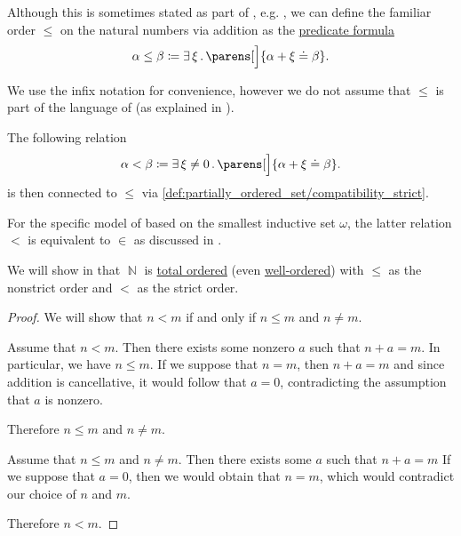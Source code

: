 \begin{definition}\label{def:natural_number_ordering}
  Although this is sometimes stated as part of , e.g. \cite[exmpl. 17.6]{OpenLogicFull}, we can define the familiar order \( \leq \) on the natural numbers via addition as the \hyperref[rem:predicate_formula]{predicate formula}
  \begin{equation}\label{eq:def:natural_number_ordering/predicate}
    \alpha \leq \beta \coloneqq \qexists \xi \parens[\Big]{ \alpha + \xi \doteq \beta }.
  \end{equation}

  We use the infix notation for convenience, however we do not assume that \( \leq \) is part of the language of  (as explained in ).

  The following relation
  \begin{equation}\label{eq:def:natural_number_ordering/strict_predicate}
    \alpha < \beta \coloneqq \qexists {\xi \neq 0} \parens[\Big]{ \alpha + \xi \doteq \beta }.
  \end{equation}
  is then connected to \( \leq \) via \eqref{def:partially_ordered_set/compatibility_strict}.

  For the specific model of  based on the smallest inductive set \( \omega \), the latter relation \( < \) is equivalent to \( \in \) as discussed in .

  We will show in  that \( \BbbN \) is \hyperref[def:totally_ordered_set]{total ordered} (even \hyperref[def:well_ordered_set]{well-ordered}) with \( \leq \) as the nonstrict order and \( < \) as the strict order.
\end{definition}
\begin{proof}
  We will show that \( n < m \) if and only if \( n \leq m \) and \( n \neq m \).

  \SufficiencySubProof Assume that \( n < m \). Then there exists some nonzero \( a \) such that \( n + a = m \). In particular, we have \( n \leq m \). If we suppose that \( n = m \), then \( n + a = m \) and since addition is cancellative, it would follow that \( a = 0 \), contradicting the assumption that \( a \) is nonzero.

  Therefore \( n \leq m \) and \( n \neq m \).

  \NecessitySubProof Assume that \( n \leq m \) and \( n \neq m \). Then there exists some \( a \) such that \( n + a = m \) If we suppose that \( a = 0 \), then we would obtain that \( n = m \), which would contradict our choice of \( n \) and \( m \).

  Therefore \( n < m \).
\end{proof}

